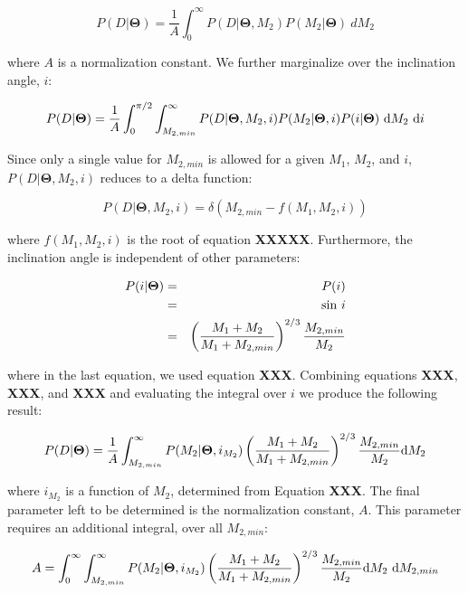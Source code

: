 \documentclass[letterpaper,12pt,preprint]{aastex}
\begin{document}
\begin{equation}
P(D|\mathbf{\Theta}) = \frac{1}{A} \int_0^{\infty} P(D |\mathbf{\Theta}, M_2) P(M_2|\mathbf{\Theta})\ dM_2 
\end{equation}

where $A$ is a normalization constant. We further marginalize over the inclination angle, $i$:

\begin{equation}
P(D|\mathbf{\Theta}) = \frac{1}{A} \int_0^{\pi/2} \int_{M_{2,min}}^{\infty} P(D | \mathbf{\Theta}, M_2, i) P(M_2|\mathbf{\Theta}, i) P(i | \mathbf{\Theta})\ {\rm d}M_2\ {\rm d}i
\end{equation}

Since only a single value for $M_{2,min}$ is allowed for a given $M_1$, $M_2$, and $i$, $P(D | \mathbf{\Theta}, M_2, i)$ reduces to a delta function:

\begin{equation}
P(D | \mathbf{\Theta}, M_2, i) = \delta \left(M_{2,min} - f(M_1,M_2,i) \right)
\end{equation}

where $f(M_1,M_2,i)$ is the root of equation {\bf XXXXX}. Furthermore, the inclination angle is independent of other parameters:

\begin{eqnarray}
P(i | \mathbf{\Theta}) &=& P(i) \\
  &=& {\rm sin}\ i \\
  &=& \left( \frac{M_1 + M_2}{M_1 + M_{2,min}} \right)^{2/3} \frac{M_{2,min}}{M_2}
\end{eqnarray}

where in the last equation, we used equation {\bf XXX}. Combining equations {\bf XXX}, {\bf XXX}, and {\bf XXX} and evaluating the integral over $i$ we produce the following result:

\begin{equation}
P(D|\mathbf{\Theta}) = \frac{1}{A} \int_{M_{2,min}}^{\infty}  P(M_2|\mathbf{\Theta},i_{M_2}) \left( \frac{M_1 + M_2}{M_1 + M_{2,min}} \right)^{2/3} \frac{M_{2,min}}{M_2} {\rm d}M_2
\end{equation}

where $i_{M_2}$ is a function of $M_2$, determined from Equation {\bf XXX}. The final parameter left to be determined is the normalization constant, $A$. This parameter requires an additional integral, over all $M_{2,min}$:

\begin{equation}
A = \int_0^{\infty} \int_{M_{2,min}}^{\infty} P(M_2|\mathbf{\Theta}, i_{M_2}) \left( \frac{M_1 + M_2}{M_1 + M_{2,min}} \right)^{2/3} \frac{M_{2,min}}{M_2} {\rm d}M_2\ {\rm d}M_{2,min}
\end{equation}
\end{document}
